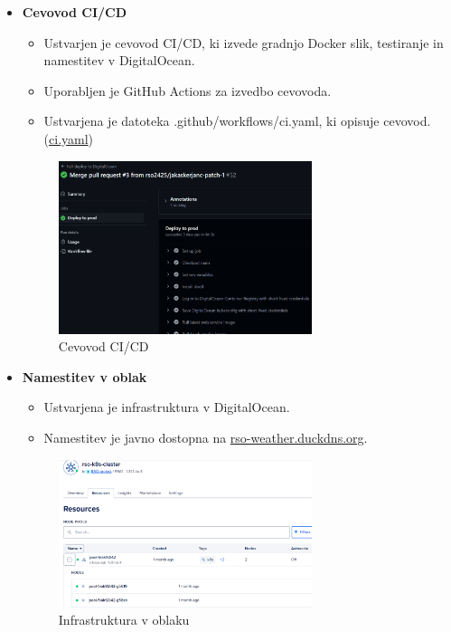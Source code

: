 \documentclass[a4paper,11pt]{article}
\begin{document}
\begin{itemize}
	\item \textbf{Cevovod CI/CD}
	      \begin{itemize}
	      	\item Ustvarjen je cevovod CI/CD, ki izvede gradnjo Docker slik, testiranje in namestitev v DigitalOcean.
	      	\item Uporabljen je GitHub Actions za izvedbo cevovoda.
	      	\item Ustvarjena je datoteka .github/workflows/ci.yaml, ki opisuje cevovod. (\href{https://github.com/rso2425/extreme-weather-event-notifier/blob/main/.github/workflows/ci.yaml}{ci.yaml})
	      \end{itemize}
	      
	      \begin{figure}[h!]
	      	\centering
	      	\includegraphics[width=0.7\textwidth]{images/ci.png}
	      	\caption{Cevovod CI/CD}
	      	\label{fig:ci}
	      \end{figure}
	      
	      
	\item \textbf{Namestitev v oblak}
	      \begin{itemize}
	      	\item Ustvarjena je infrastruktura v DigitalOcean.
	      	\item Namestitev je javno dostopna na \href{https://rso-weather.duckdns.org/}{rso-weather.duckdns.org}.
	      \end{itemize}
	      
	      
	      \begin{figure}[h!]
	      	\centering
	      	\includegraphics[width=0.7\textwidth]{images/digitalocean.png}
	      	\caption{Infrastruktura v oblaku}
	      	\label{fig:do}
	      \end{figure}
	              

\end{itemize}
\end{document}

